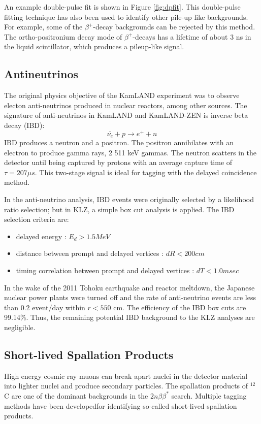 An example double-pulse fit is shown in Figure \ref{fig:dpfit}. This double-pulse fitting technique has also been used to identify other pile-up like backgrounds. For example, some of the $\beta^+$-decay backgrounds can be rejected by this method. The ortho-positronium decay mode of $\beta^+$-decays has a lifetime of about 3 ns in the liquid scintillator, which produces a pileup-like signal.

\subsection{Antineutrinos}
The original physics objective of the KamLAND experiment was to observe electon anti-neutrinos produced in nuclear reactors, among other sources. The signature of anti-neutrinos in KamLAND and KamLAND-ZEN is inverse beta decay (IBD):
\begin{equation}
	\bar{\nu_e}+p\rightarrow e^+ + n
\end{equation}
IBD produces a neutron and a positron. The positron annihilates with an electron to produce gamma rays, 2 511 keV gammas. The neutron scatters in the detector until being captured by protons with an average capture time of $\tau=207\mu s$. This two-stage signal is ideal for tagging with the delayed coincidence method.

In the anti-neutrino analysis, IBD events were originally selected by a likelihood ratio selection; but in KLZ, a simple box cut analysis is applied. The IBD selection criteria are:
\begin{itemize}
	\item delayed energy : $E_d>1.5 MeV$
	\item distance between prompt and delayed vertices : $dR<200cm$
	\item timing correlation between prompt and delayed vertices : $dT < 1.0msec$
\end{itemize}
In the wake of the 2011 Tohoku earthquake and reactor meltdown, the Japanese nuclear power plants were turned off and the rate of anti-neutrino events are less than 0.2 event/day within $r<550$ cm. The efficiency of the IBD box cuts are 99.14\%. Thus, the remaining potential IBD background to the KLZ analyses are negligible.
\subsection{Short-lived Spallation Products}
High energy cosmic ray muons can break apart nuclei in the detector material into lighter nuclei and produce secondary particles. The spallation products of $^{12}$C are one of the dominant backgrounds in the $2n\beta\beta^*$ search. Multiple tagging methods have been developedfor identifying so-called short-lived spallation products.
